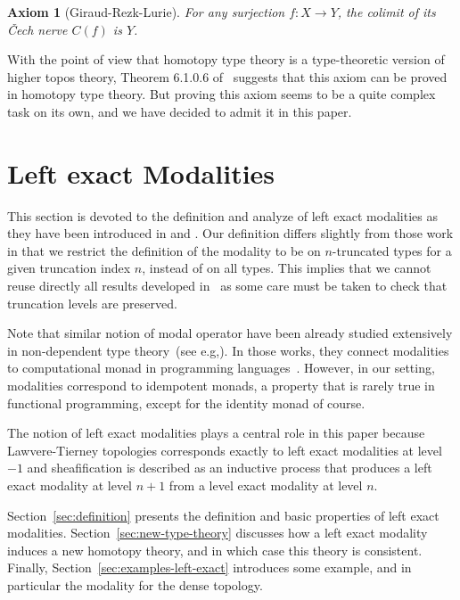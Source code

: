 \documentclass[conference]{IEEEtran}
\newtheorem{ax}[thm]{Axiom}
\newcommand{\eg}{e.g,\xspace}
\begin{document}
\begin{ax}[Giraud-Rezk-Lurie]
  For any surjection $f : X \to Y$, the colimit of its \v{C}ech nerve
  $C(f)$ is $Y$.
\end{ax}

With the point of view that homotopy type theory is a type-theoretic
version of higher topos theory, Theorem 6.1.0.6 of~\cite{lurie}
suggests that this axiom can be proved in homotopy type theory. 
%
But proving this axiom seems to be a quite complex task on its own,
and we have decided to admit it in this paper.



\section{Left exact Modalities}
\label{sec:lexmod}

This section is devoted to the definition and analyze of left exact
modalities as they have been introduced in \cite{hottbook} and
\cite{shulman-higher-modalities}. Our definition differs slightly from
those work in that we restrict the definition of the modality to be on
$n$-truncated types for a given truncation index $n$, instead of on
all types.
%
This implies that we cannot reuse directly all results developed
in~\cite{hottbook} as some care must be taken to check that truncation
levels are preserved.

Note that similar notion of modal operator have been already studied
extensively in non-dependent type
theory~(see \eg \cite{benton1998computational}). In those works, they connect
modalities to computational monad in programming
languages~\cite{moggi-monad}. However, in our setting, modalities
correspond to idempotent monads, a property that is rarely true 
in functional programming, except for the identity monad of course.

The notion of left exact modalities plays a central role in this paper
because Lawvere-Tierney topologies corresponds exactly to left exact
modalities at level $-1$ and sheafification is described as an inductive
process that produces a left exact modality at level $n+1$ from a
level exact modality at level $n$. 

Section~\ref{sec:definition} presents the definition and basic
properties of left exact modalities. 
%
Section~\ref{sec:new-type-theory} discusses how a left exact modality
induces a new homotopy theory, and in which case this theory is
consistent.
%
Finally, Section~\ref{sec:examples-left-exact} introduces some
example, and in particular the modality for the dense topology.
\end{document}
